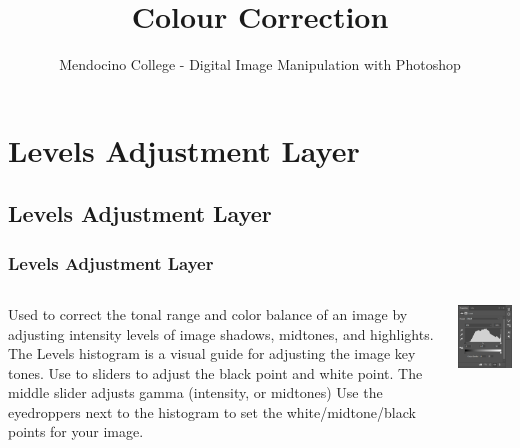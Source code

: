 \documentclass{beamer}
\title{Colour Correction}
\author{Mendocino College - Digital Image Manipulation with Photoshop}
\date{\vspace{-5em}}
\begin{document}
	{
		\begin{frame}
			\vspace{-35pt}
			\maketitle
		\end{frame}
	}

	\section{Levels Adjustment Layer}
\subsection{Levels Adjustment Layer}		
\begin{frame}
	\frametitle{Levels Adjustment Layer}
	\begin{columns}
		\column{.7\textwidth}
		\begin{outline}
			\1  Used to correct the tonal range and color balance of an image by adjusting intensity levels of image shadows, midtones, and highlights. 
			\1 The Levels histogram is a visual guide for adjusting the image key tones.
			\1 Use to sliders to adjust the black point and white point.
			\2 The middle slider adjusts gamma (intensity, or midtones)
			\1 Use the eyedroppers next to the histogram to set the white/midtone/black points for your image.
		\end{outline}
		\column{.45\textwidth}
		\includegraphics[width=1.0\textwidth]{images/levels.png}
	\end{columns}
\end{frame}
\end{document}
